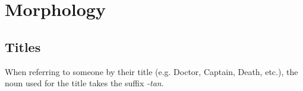 \documentclass[main.tex]{subfiles}
\begin{document}
\section{Morphology}

\subsection{Titles}
When referring to someone by their title (e.g. Doctor, Captain, Death, etc.),
the noun used for the title takes the suffix \textit{-tan}.
\end{document}
